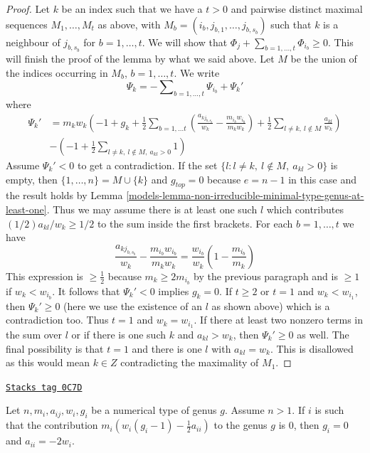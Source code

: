 \begin{proof}
\medskip\noindent
Let $k$ be an index such that we have a $t > 0$ and pairwise distinct
maximal sequences $M_1, \ldots, M_t$ as above, with
$M_b = (i_b, j_{b, 1}, \ldots, j_{b, s_b})$
such that $k$ is a neighbour of $j_{b, s_b}$ for $b = 1, \ldots, t$.
We will show that $\Phi_j + \sum_{b = 1, \ldots, t} \Phi_{i_b} \geq 0$.
This will finish the proof of the lemma by what we said above.
Let $M$ be the union of the indices occurring in $M_b$, $b = 1, \ldots, t$.
We write
$$
\Psi_k =
-\sum\nolimits_{b = 1, \ldots, t} \Psi_{i_b} + \Psi_k'
$$
where
\begin{align*}
\Psi_k' & =
m_kw_k\left(-1 + g_k +
\frac{1}{2} \sum\nolimits_{b = 1, \ldots t}
(\frac{a_{kj_{b, s_b}}}{w_k} - \frac{m_{i_b}w_{i_b}}{m_kw_k}) +
\frac{1}{2} \sum\nolimits_{l \not = k,\ l \not \in M}
\frac{a_{kl}}{w_k}
\right) \\
&
-\left(
-1 + \frac{1}{2}\sum\nolimits_{l \not = k,\ l \not \in M,\ a_{kl} > 0} 1
\right)
\end{align*}
Assume $\Psi_k' < 0$ to get a contradiction.
If the set $\{l : l \not = k,\ l \not \in M,\ a_{kl} > 0\}$ is empty,
then $\{1, \ldots, n\} = M \cup \{k\}$ and $g_{top} = 0$
because $e = n - 1$ in this case and the result holds by
Lemma \ref{models-lemma-non-irreducible-minimal-type-genus-at-least-one}.
Thus we may assume there is at least one such $l$ which contributes
$(1/2)a_{kl}/w_k \geq 1/2$ to the sum inside the first brackets.
For each $b = 1, \ldots, t$ we have
$$
\frac{a_{kj_{b, s_b}}}{w_k} - \frac{m_{i_b}w_{i_b}}{m_kw_k} =
\frac{w_{i_b}}{w_k}(1 - \frac{m_{i_b}}{m_k})
$$
This expression is $\geq \frac{1}{2}$ because $m_k \geq 2m_{i_b}$
by the previous paragraph and is $\geq 1$ if $w_k < w_{i_b}$.
It follows that $\Psi_k' < 0$ implies $g_k = 0$.
If $t \geq 2$ or $t = 1$ and $w_k < w_{i_1}$, then $\Psi_k' \geq 0$
(here we use the existence of an $l$ as shown above) which
is a contradiction too.
Thus $t = 1$ and $w_k = w_{i_1}$. If there at least two nonzero terms
in the sum over $l$ or if there is one such $k$ and $a_{kl} > w_k$, then
$\Psi_k' \geq 0$ as well. The final possibility is that $t = 1$ and
there is one $l$ with $a_{kl} = w_k$. This is disallowed as this would
mean $k \in Z$ contradicting the maximality of $M_1$.
\end{proof}

\begin{lemma}
\label{models-lemma-minus-two}
\href{https://stacks.math.columbia.edu/tag/0C7D}{\texttt{Stacks tag 0C7D}}

Let $n, m_i, a_{ij}, w_i, g_i$ be a numerical type of genus $g$.
Assume $n > 1$. If $i$ is such that the contribution
$m_i(w_i(g_i - 1) - \frac{1}{2} a_{ii})$
to the genus $g$ is $0$, then $g_i = 0$ and $a_{ii} = -2w_i$.
\end{lemma}

